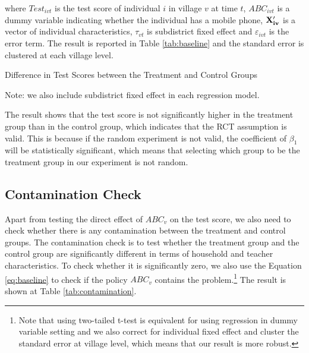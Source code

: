 \documentclass[12pt]{jfm}
\begin{document}
where $Test_{ivt}$ is the test score of individual $i$ in village $v$ at time $t$, $ABC_{ivt}$ is a dummy variable indicating whether the individual has a mobile phone, $\bf{X}_{iv}^\prime$ is a vector of individual characteristics, $\tau_{vt}$ is subdistrict fixed effect and $\varepsilon_{ivt}$ is the error term. The result is reported in Table \ref{tab:baseline} and the standard error is clustered at each village level.

\begin{table}
  \begin{center}
    \begin{footnotesize}
    \caption{Difference in Test Scores between the Treatment and Control Groups}
    \label{tab:baseline}
    

    Note: we also include subdistrict fixed effect in each regression model.
    \end{footnotesize}
  \end{center}
\end{table}

The result shows that the test score is not significantly higher in the treatment group than in the control group, which indicates that the RCT assumption is valid. This is because if the random experiment is not valid, the coefficient of $\beta_1$ will be statistically significant, which means that selecting which group to be the treatment group in our experiment is not random.

\subsection{Contamination Check} \label{subsec:contamination}

Apart from testing the direct effect of $ABC_{v}$ on the test score, we also need to check whether there is any contamination between the treatment and control groups. The contamination check is to test whether the treatment group and the control group are significantly different in terms of household and teacher characteristics. To check whether it is significantly zero, we also use the Equation \eqref{eq:baseline} to check if the policy $ABC_{v}$ contains the problem.\footnote{Note that using two-tailed t-test is equivalent for using regression in dummy variable setting and we also correct for individual fixed effect and cluster the standard error at village level, which means that our result is more robust.} The result is shown at Table \ref{tab:contamination}.
\end{document}

